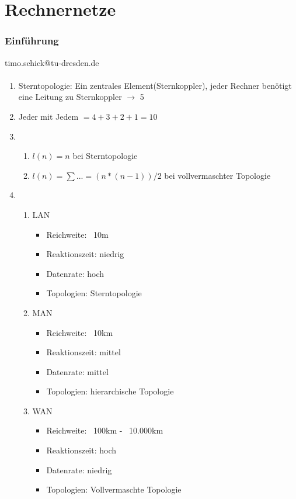 
\part{Rechnernetze}
\section{Einführung}
timo.schick@tu-dresden.de

\subsection{}
\begin{enumerate}
	\item Sterntopologie: Ein zentrales Element(Sternkoppler), jeder 				Rechner benötigt eine Leitung zu Sternkoppler \(\to\) 5
	\item Jeder mit Jedem \(= 4+3+2+1=10\)
	\item
	\begin{enumerate}
		\item \(l(n)= n\) bei Sterntopologie
		\item \(l(n) = \sum ... = (n*(n-1))/2\) bei vollvermaschter 					Topologie
	\end{enumerate}
	\item
	\begin{enumerate}
		\item LAN
		\begin{itemize}
			\item Reichweite: ~10m
			\item Reaktionszeit: niedrig
			\item Datenrate: hoch
			\item Topologien: Sterntopologie
		\end{itemize}
		\item MAN
		\begin{itemize}
			\item Reichweite: ~10km
			\item Reaktionszeit: mittel
			\item Datenrate: mittel
			\item Topologien: hierarchische Topologie
		\end{itemize}
		\item WAN
		\begin{itemize}
			\item Reichweite: ~100km - ~10.000km
			\item Reaktionszeit: hoch
			\item Datenrate: niedrig
			\item Topologien: Vollvermaschte Topologie
		\end{itemize}
	\end{enumerate}
\end{enumerate}

